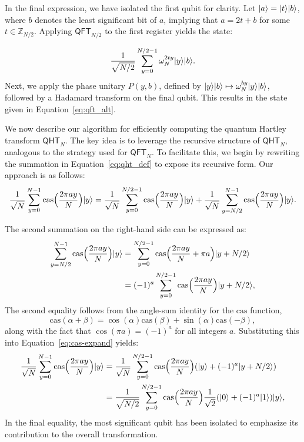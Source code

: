 \documentclass[12pt]{report}
\newcommand{\cas}{\mathrm{cas}}
\newcommand{\qht}{\mathsf{QHT}}
\newcommand{\qft}{\mathsf{QFT}}
\begin{document}
In the final expression, we have isolated the first qubit for clarity. Let \( \lvert a\rangle = \lvert t\rangle\lvert b\rangle \), where \( b \) denotes the least significant bit of \( a \), implying that \( a = 2t + b \) for some \( t \in \mathbb{Z}_{N / 2} \). Applying \( \qft_{N / 2} \) to the first register yields the state:

\[ \frac{1}{\sqrt{N / 2}} \sum_{y = 0}^{N / 2 - 1} \omega_N^{2ty} \lvert y\rangle \lvert b\rangle. \]
Next, we apply the phase unitary \( P(y, b) \), defined by \( \lvert y\rangle \lvert b\rangle \mapsto \omega_N^{by} \lvert y\rangle \lvert b\rangle \), followed by a Hadamard transform on the final qubit. This results in the state given in Equation~\eqref{eq:qft_alt}.


We now describe our algorithm for efficiently computing the quantum Hartley transform \( \qht_N \). The key idea is to leverage the recursive structure of \( \qht_N \), analogous to the strategy used for \( \qft_N \). To facilitate this, we begin by rewriting the summation in Equation~\eqref{eq:qht_def} to expose its recursive form. Our approach is as follows:
\begin{equation}
    \label{eq:cas-expand}
	\frac{1}{\sqrt{N}} \sum_{y = 0}^{N - 1} \cas\Big( \frac{2\pi a y}{N} \Big) \ket{y}
    = \frac{1}{\sqrt{N}} \sum_{y = 0}^{N / 2 - 1} \cas\Big( \frac{2\pi a y}{N} \Big) \ket{y} + \frac{1}{\sqrt{N}} \sum_{y = N / 2}^{N - 1} \cas\Big( \frac{2\pi a y}{N} \Big) \ket{y}.
\end{equation}



The second summation on the right-hand side can be expressed as:
\begin{align*}
	\sum_{y = N / 2}^{N - 1} \cas\Big( \frac{2\pi a y}{N} \Big) \ket{y}
    & = \sum_{y = 0}^{N / 2 - 1} \cas\Big( \frac{2\pi a y}{N} + \pi a \Big) \ket{y + N/2} \\
    & = (-1)^a \sum_{y = 0}^{N / 2 - 1} \cas\Big( \frac{2\pi a y}{N} \Big) \ket{y + N/2},
\end{align*}
The second equality follows from the angle-sum identity for the \( \cas \) function,
\[
\cas(\alpha + \beta) = \cos(\alpha)\cas(\beta) + \sin(\alpha)\cas(-\beta),
\]
along with the fact that \( \cos(\pi a) = (-1)^a \) for all integers \( a \). Substituting this into Equation~\eqref{eq:cas-expand} yields:
\begin{align}
	\frac{1}{\sqrt{N}} \sum_{y = 0}^{N - 1} \cas\Big( \frac{2\pi a y}{N} \Big) \ket{y}
    & = \frac{1}{\sqrt{N}} \sum_{y = 0}^{N / 2 - 1} \cas\Big( \frac{2\pi a y}{N} \Big) (\ket{y} + (-1)^a \ket{y + N/2}) \nonumber \\
    & = \frac{1}{\sqrt{N / 2}} \sum_{y = 0}^{N / 2 - 1} \cas\Big( \frac{2\pi a y}{N} \Big) \frac{1}{\sqrt{2}} (\ket{0} + (-1)^a \ket{1}) \ket{y}, \label{eq:qht-alt} 
\end{align}
In the final equality, the most significant qubit has been isolated to emphasize its contribution to the overall transformation.
\end{document}
